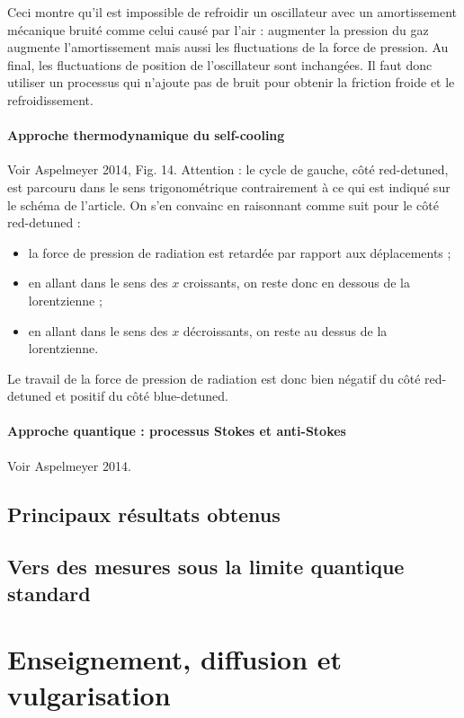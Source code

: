 \documentclass[12pt,a4paper]{article}
\begin{document}
Ceci montre qu'il est impossible de refroidir un oscillateur avec un amortissement mécanique bruité comme celui causé par l'air : augmenter la pression du gaz augmente l'amortissement mais aussi les fluctuations de la force de pression.
Au final, les fluctuations de position de l'oscillateur sont inchangées.
Il faut donc utiliser un processus qui n'ajoute pas de bruit pour obtenir la friction froide et le refroidissement.

\paragraph{Approche thermodynamique du self-cooling\\}
Voir Aspelmeyer 2014, Fig. 14.
Attention : le cycle de gauche, côté red-detuned, est parcouru dans le sens trigonométrique contrairement à ce qui est indiqué sur le schéma de l'article.
On s'en convainc en raisonnant comme suit pour le côté red-detuned :
\begin{itemize}
\item la force de pression de radiation est retardée par rapport aux déplacements ;
\item en allant dans le sens des $x$ croissants, on reste donc en dessous de la lorentzienne ;
\item en allant dans le sens des $x$ décroissants, on reste au dessus de la lorentzienne.
\end{itemize}
Le travail de la force de pression de radiation est donc bien négatif du côté red-detuned et positif du côté blue-detuned.

\paragraph{Approche quantique : processus Stokes et anti-Stokes\\}
Voir Aspelmeyer 2014.


\subsection{Principaux résultats obtenus}
\label{sec:results}

\subsection{Vers des mesures sous la limite quantique standard}
\label{sec:prospects}

\section{Enseignement, diffusion et vulgarisation}
\end{document}
